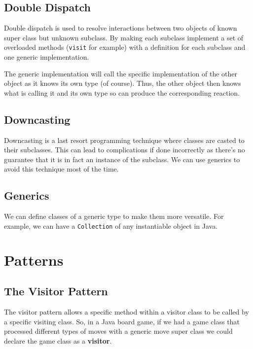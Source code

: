 \documentclass[a4paper, 12pt, twoside]{article}
\begin{document}
\subsection{Double Dispatch}

Double dispatch is used to resolve interactions between two objects
of known super class but unknown subclass. By making each subclass
implement a set of overloaded methods (\texttt{visit} for example)
with a definition for each subclass and one generic implementation.

\vspace{\baselineskip}

The generic implementation will call the specific implementation of
the other object as it knows its own type (of course). Thus,
the other object then knows what is calling it and its own type
so can produce the corresponding reaction.

\subsection{Downcasting}

Downcasting is a last resort programming technique where classes
are casted to their subclasses. This can lead to complications if
done incorrectly as there's no guarantee that it is in fact
an instance of the subclass. We can use generics to avoid this
technique most of the time.

\subsection{Generics}

We can define classes of a generic type to make them more versatile.
For example, we can have a \texttt{Collection} of any instantiable
object in Java.

\section{Patterns}

\subsection{The Visitor Pattern}

The visitor pattern allows a specific method within a visitor class
to be called by a specific visiting class. So, in a Java board game, 
if we had a game class that processed different types of moves
with a generic move super class we could declare the game class
as a \textbf{visitor}.
\end{document}
